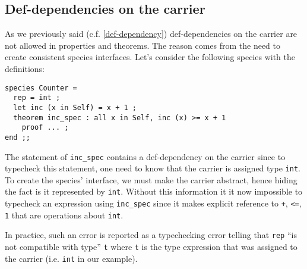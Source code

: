 \subsection{Def-dependencies on the carrier}
\label{def-dep-on-carrier}
As we previously said (c.f. \ref{def-dependency}) def-dependencies on
the carrier are not allowed in properties and theorems. The reason
comes from the need to create consistent species interfaces. Let's
consider the following species with the definitions:
{\scriptsize
\begin{lstlisting}
species Counter =
  rep = int ;
  let inc (x in Self) = x + 1 ;
  theorem inc_spec : all x in Self, inc (x) >= x + 1
    proof ... ;
end ;;
\end{lstlisting}
}

The statement of {\tt inc\_spec} contains a def-dependency on the
carrier since to typecheck this statement, one need to know that the
carrier is assigned type {\tt int}. To create the species' interface,
we must make the carrier abstract, hence hiding the fact is it
represented by {\tt int}. Without this information it it now
impossible to typecheck an expression using {\tt inc\_spec} since it
makes explicit reference to {\tt +}, {\tt <=}, {\tt 1} that are
operations about {\tt int}.

In practice, such an error is reported as a typechecking error telling
that {\tt rep} ``is not compatible with type'' {\tt t} where {\tt t}
is the type expression that was assigned to the carrier (i.e.
{\tt int} in 
our example).
